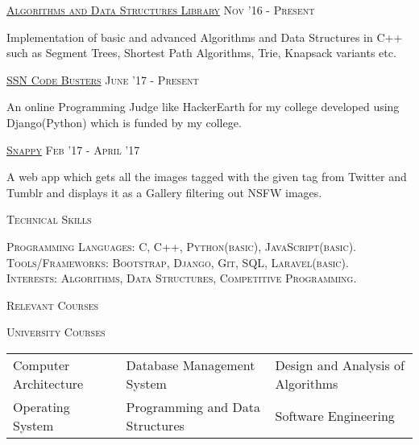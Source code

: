 \documentclass[10pt]{article}
\begin{document}
	\large{\textsc{\href{https://github.com/chamow97/Algorithm-DS-Library}{Algorithms and Data Structures Library}}   \hfill \small\textsc{Nov '16 - Present}
	\begin{itemize}
	\small
	{
	\item Implementation of basic and advanced Algorithms and Data Structures in C++ such as Segment Trees, Shortest Path Algorithms, Trie, Knapsack variants etc.
	}
	\end{itemize}	
	\vspace{2mm}
	\large{\textsc{\href{https://github.com/chamow97/SSNCB}{SSN Code Busters}}}   \hfill \small\textsc{June '17 - Present}
	\begin{itemize}
	\small
	{
	\item An online Programming Judge like HackerEarth for my college developed using Django(Python) which is funded by my college.
	}
	\end{itemize}	
	\vspace{2mm}
	\large{\textsc{\href{https://github.com/chamow97/snappy}{Snappy}}}   \hfill \small\textsc{Feb '17 - April '17}
	\begin{itemize}
	\small
	{
	\item A web app which gets all the images tagged with the given tag from Twitter and Tumblr and displays it as a Gallery filtering out NSFW images.
	}
	\end{itemize}	
	\vspace{3mm}
	
		{\centering\Large{\textsc{Technical Skills}}\hrulefill}
	
	\vspace{3mm}

	\normalsize{
	\textsc{Programming Languages:} \textsc{C, C++, Python(basic), JavaScript(basic).} \\
	\textsc{Tools/Frameworks:} \textsc{Bootstrap, Django, Git, SQL, Laravel(basic).}
	}\\
	\textsc{Interests:} \textsc{Algorithms, Data Structures, Competitive Programming.}
			
	\vspace{4mm}
		{\centering\Large{\textsc{Relevant Courses}}\hrulefill}
		
	\vspace{4mm}
	\large{\textsc{University Courses}}
	\vspace{2mm}
	\begin{small}
	
	\begin{tabular}{p{7.2cm} p{5.7cm} p{6cm}}
	{Computer Architecture} & {Database Management System} &{Design and Analysis of Algorithms}\\
	{Operating System} & {Programming and Data Structures} &	{Software Engineering}\\
	\end{tabular}
	

\end{small}}
\end{document}
